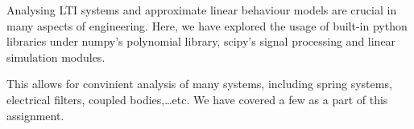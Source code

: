 \documentclass[11pt]{article}
\begin{document}
Analysing LTI systems and approximate linear behaviour models are
crucial in many aspects of engineering. Here, we have explored the usage
of built-in python libraries under numpy's polynomial library, scipy's
signal processing and linear simulation modules.

This allows for convinient analysis of many systems, including spring
systems, electrical filters, coupled bodies,\ldots{}etc. We have covered
a few as a part of this assignment.


    
    
    
    
\end{document}
